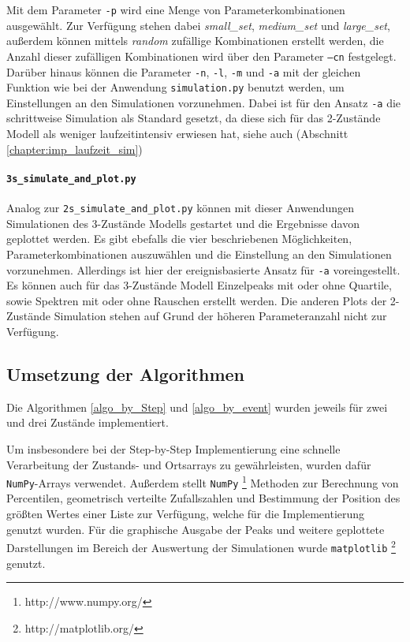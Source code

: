 Mit dem Parameter \texttt{-p} wird eine Menge von Parameterkombinationen ausgewählt. Zur Verfügung stehen dabei \textit{small\_set}, \textit{medium\_set} und \textit{large\_set}, außerdem können mittels \textit{random} zufällige Kombinationen erstellt werden, die Anzahl dieser zufälligen Kombinationen wird über den Parameter \texttt{--cn} festgelegt. %
Darüber hinaus können die Parameter \texttt{-n}, \texttt{-l}, \texttt{-m} und \texttt{-a} mit der gleichen Funktion wie bei der Anwendung \texttt{simulation.py} benutzt werden, um Einstellungen an den Simulationen vorzunehmen. Dabei ist für den Ansatz \texttt{-a} die schrittweise Simulation als Standard gesetzt, da diese sich für das 2-Zustände Modell als weniger laufzeitintensiv erwiesen hat, siehe auch (Abschnitt \ref{chapter:imp_laufzeit_sim})


\paragraph{\texttt{3s\_simulate\_and\_plot.py}}
Analog zur \texttt{2s\_simulate\_and\_plot.py} können mit dieser Anwendungen Simulationen des 3-Zustände Modells gestartet und die Ergebnisse davon geplottet werden. Es gibt ebefalls die vier beschriebenen Möglichkeiten, Parameterkombinationen auszuwählen und die Einstellung an den Simulationen vorzunehmen. Allerdings ist hier der ereignisbasierte Ansatz für \texttt{-a} voreingestellt.
Es können auch für das 3-Zustände Modell Einzelpeaks mit oder ohne Quartile, sowie Spektren mit oder ohne Rauschen erstellt werden. Die anderen Plots der 2-Zustände Simulation stehen auf Grund der höheren Parameteranzahl nicht zur Verfügung.



\subsection{Umsetzung der Algorithmen}
Die Algorithmen \ref{algo_by_Step} und \ref{algo_by_event} wurden jeweils für zwei und drei Zustände implementiert. 
 
Um insbesondere bei der Step-by-Step Implementierung eine schnelle Verarbeitung der Zustands- und Ortsarrays zu gewährleisten, wurden dafür \texttt{NumPy}-Arrays verwendet. Außerdem stellt \texttt{NumPy} \footnote{http://www.numpy.org/} Methoden zur Berechnung von Percentilen, geometrisch verteilte Zufallszahlen und Bestimmung der Position des größten Wertes einer Liste zur Verfügung, welche für die Implementierung genutzt wurden.
Für die graphische Ausgabe der Peaks und weitere geplottete Darstellungen im Bereich der Auswertung der Simulationen wurde \texttt{matplotlib} \footnote{http://matplotlib.org/} genutzt.

